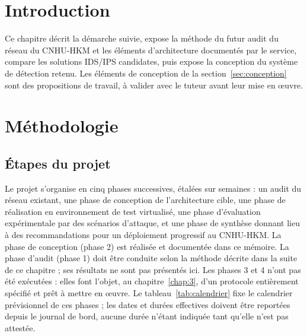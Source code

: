 \section*{Introduction}

Ce chapitre décrit la démarche suivie, expose la méthode du futur audit du réseau du CNHU-HKM et les éléments d'architecture documentés par le service, compare les solutions IDS/IPS candidates, puis expose la conception du système de détection retenu. Les éléments de conception de la section~\ref{sec:conception} sont des propositions de travail, à valider avec le tuteur avant leur mise en œuvre.

\section{Méthodologie}

\subsection{Étapes du projet}

Le projet s'organise en cinq phases successives, étalées sur  semaines : un audit du réseau existant, une phase de conception de l'architecture cible, une phase de réalisation en environnement de test virtualisé, une phase d'évaluation expérimentale par des scénarios d'attaque, et une phase de synthèse donnant lieu à des recommandations pour un déploiement progressif au CNHU-HKM. La phase de conception (phase 2) est réalisée et documentée dans ce mémoire. La phase d'audit (phase 1) doit être conduite selon la méthode décrite dans la suite de ce chapitre ; ses résultats ne sont pas présentés ici. Les phases 3 et 4 n'ont pas été exécutées : elles font l'objet, au chapitre~\ref{chap:3}, d'un protocole entièrement spécifié et prêt à mettre en œuvre. Le tableau~\ref{tab:calendrier} fixe le calendrier prévisionnel de ces phases ; les dates et durées effectives doivent être reportées depuis le journal de bord, aucune durée n'étant indiquée tant qu'elle n'est pas attestée.

